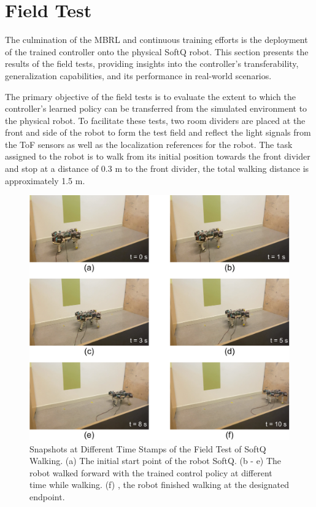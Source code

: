 \section{Field Test}
The culmination of the MBRL and continuous training efforts is the deployment of the trained controller onto the physical SoftQ robot. This section presents the results of the field tests, providing insights into the controller's transferability, generalization capabilities, and its performance in real-world scenarios.

The primary objective of the field tests is to evaluate the extent to which the controller's learned policy can be transferred from the simulated environment to the physical robot. To facilitate these tests, two room dividers are placed at the front and side of the robot to form the test field and reflect the light signals from the ToF sensors as well as the localization references for the robot. The task assigned to the robot is to walk from its initial position towards the front divider and stop at a distance of 0.3 m to the front divider, the total walking distance is approximately 1.5 m. 

\begin{figure}[htb]
    \centering
    \includegraphics[width=0.9\linewidth]{img/chap5/real_test.pdf}
    \caption{Snapshots at Different Time Stamps of the Field Test of SoftQ Walking. (a) The initial start point of the robot SoftQ. (b - e) The robot walked forward with the trained control policy at different time while walking. (f) , the robot finished walking at the designated endpoint.}
    \label{fig:real_test}
\end{figure}

